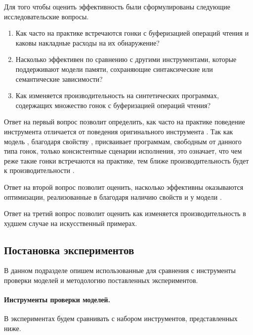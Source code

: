 Для того чтобы оценить эффективность \wmc были 
сформулированы следующие исследовательские вопросы.
\begin{enumerate}

  \item Как часто на практике встречаются гонки с буферизацией операций чтения
    и каковы накладные расходы на их обнаружение?

  \item Насколько эффективен \wmc по сравнению с другими инструментами, 
    которые поддерживают модели памяти, 
    сохраняющие синтаксические или семантические зависимости? 

  \item Как изменяется производительность \wmc на синтетических программах, 
    содержащих множество гонок с буферизацией операций чтения? 
    
\end{enumerate}

Ответ на первый вопрос позволит определить, как часто 
на практике поведение инструмента \wmc отличается от поведения 
оригинального инструмента \genmc.
Так как модель \WkmS, благодаря свойству \LBRF, присваивает 
программам, свободным от данного типа гонок, 
только \RCMM консистентные сценарии исполнения, 
это означает, что чем реже такие гонки встречаются на практике, 
тем ближе производительность \wmc будет к производительности \genmc.

Ответ на второй вопрос позволит оценить, насколько эффективны 
оказываются оптимизации, реализованные в \wmc благодаря 
наличию свойств \LBRF и \CL у модели \WkmS.  

Ответ на третий вопрос позволит оценить как изменяется 
производительность \wmc в худшем случае на искусственный примерах.

\subsection*{Постановка экспериментов}

В данном подразделе опишем использованные для сравнения 
с \wmc инструменты проверки моделей и методологию поставленных экспериментов.

\paragraph{Инструменты проверки моделей.}

В экспериментах будем сравнивать \wmc с набором инструментов, 
представленных ниже. 

